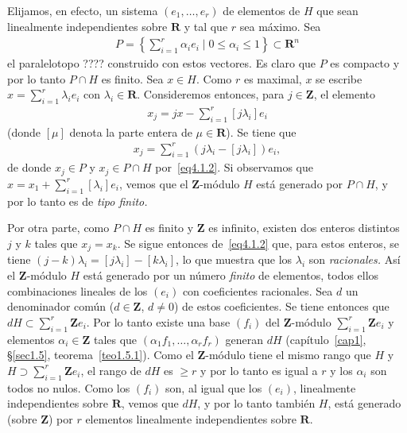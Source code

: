 \documentclass[bibtotoc,leqno,spanish]{amsbook}
\newcommand{\RR}{\mathbf{R}}
\newcommand{\ZZ}{\mathbf{Z}}
\numberwithin{equation}{section}
\theoremstyle{note}
\theoremstyle{note}
\theoremstyle{rem}
\numberwithin{theorem}{section}
\numberwithin{proposition}{section}
\numberwithin{definition}{section}
\numberwithin{lemma}{section}
\numberwithin{corollary}{section}
\numberwithin{example}{section}
\numberwithin{footnote}{section}%
\begin{document}
Elijamos, en efecto, un sistema $(e_{1},\dots,e_{r})$ de elementos de $H$ que sean linealmente independientes
sobre $\RR$ y tal que $r$ sea m\'aximo. Sea
\begin{gather}
P = \left\{\sum_{i=1}^{r}\alpha_{i}e_{i}\mid 0\leq\alpha_{i}\leq 1\right\}\subset\RR^{n}
\end{gather}
el paralelotopo ???? construido con estos vectores. Es claro que $P$ es compacto y por lo tanto
$P\cap H$ es finito. Sea $x\in H$. Como $r$ es maximal, $x$ se escribe $x = \sum_{i=1}^{r}\lambda_{i}e_{i}$
con $\lambda_{i}\in\RR$. Consideremos entonces, para $j\in\ZZ$, el elemento
\begin{gather}\label{eq4.1.2}
x_{j} = jx-\sum_{i=1}^{r}[j\lambda_{i}]e_{i}
\end{gather}
(donde $[\mu]$ denota la parte entera de $\mu\in\RR$). Se tiene que
\begin{gather*}
x_{j} = \sum_{i=1}^{r}(j\lambda_{i}-[j\lambda_{i}])e_{i},
\end{gather*}
de donde $x_{j}\in P$ y $x_{j}\in P\cap H$ por~\eqref{eq4.1.2}. Si observamos que $x = x_{1}+\sum_{i=1}^{r}[\lambda_{i}]e_{i}$,
vemos que el $\ZZ$-m\'odulo $H$ est\'a generado por $P\cap H$, y por lo tanto es de {\em tipo finito.}

Por otra parte, como $P\cap H$ es finito y $\ZZ$ es infinito, existen dos enteros distintos $j$ y $k$
tales que $x_{j} = x_{k}$. Se sigue entonces de~\eqref{eq4.1.2} que, para estos enteros, se tiene
$(j-k)\lambda_{i} = [j\lambda_{i}]-[k\lambda_{i}]$, lo que muestra que los $\lambda_{i}$ son
{\em racionales.} As\'i el $\ZZ$-m\'odulo $H$ est\'a generado por un
n\'umero {\em finito} de elementos,
todos ellos combinaciones lineales de los $(e_{i})$ con coeficientes racionales.
Sea $d$ un denominador
com\'un ($d\in\ZZ$, $d\neq 0$) de estos coeficientes. Se tiene entonces
que $dH\subset\sum_{i=1}^{r}\ZZ e_{i}$.
Por lo tanto existe una base $(f_{i})$ del $\ZZ$-m\'odulo $\sum_{i=1}^{r}\ZZ e_{i}$ y elementos
$\alpha_{i}\in\ZZ$ tales que $(\alpha_{1}f_{1},\dots,\alpha_{r}f_{r})$ generan $dH$
(cap\'itulo~\ref{cap1}, \S\ref{sec1.5}, teorema~\ref{teo1.5.1}).
Como el $\ZZ$-m\'odulo tiene el mismo rango que $H$ y $H\supset\sum_{i=1}^{r}\ZZ e_{i}$,
el rango de
$dH$ es $\geq r$ y por lo tanto es igual a $r$ y los $\alpha_{i}$ son todos no nulos.
Como los $(f_{i})$
son, al igual que los $(e_{i})$, linealmente independientes sobre $\RR$, vemos que $dH$,
y por lo tanto
tambi\'en $H$, est\'a generado (sobre $\ZZ$) por $r$ elementos linealmente independientes
sobre $\RR$.
\end{document}
